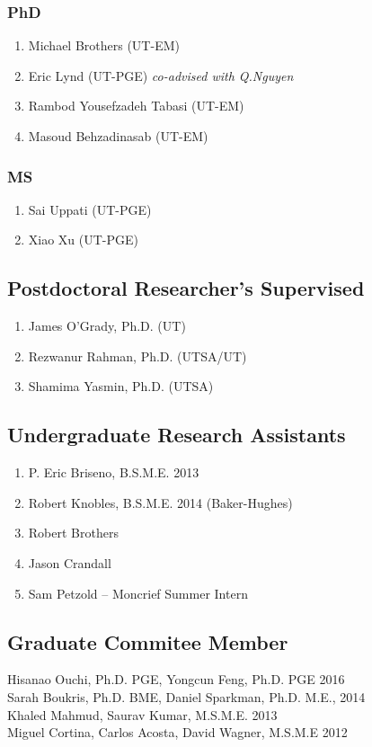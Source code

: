 \subsubsection*{PhD}
\begin{enumerate}
    \item Michael Brothers (UT-EM)
    \item Eric Lynd (UT-PGE) \emph{co-advised with Q.Nguyen}
    \item Rambod Yousefzadeh Tabasi (UT-EM)
    \item Masoud Behzadinasab (UT-EM)
\end{enumerate}

\subsubsection*{MS}
\begin{enumerate}
    \item Sai Uppati (UT-PGE)
    \item Xiao Xu (UT-PGE)
\end{enumerate}

\subsection*{Postdoctoral Researcher's Supervised}
  \begin{enumerate}
      \item James O'Grady, Ph.D. (UT)
      \item Rezwanur Rahman, Ph.D. (UTSA/UT)
      \item Shamima Yasmin, Ph.D. (UTSA)
  \end{enumerate}

\subsection*{Undergraduate Research Assistants}
  \begin{enumerate}
    \item P. Eric Briseno, B.S.M.E. 2013
    \item Robert Knobles, B.S.M.E. 2014 (Baker-Hughes)
    \item Robert Brothers
    \item Jason Crandall
    \item Sam Petzold -- Moncrief Summer Intern
  \end{enumerate}

\subsection*{Graduate Commitee Member}
Hisanao Ouchi, Ph.D. PGE, Yongcun Feng, Ph.D. PGE 2016 \\
Sarah Boukris, Ph.D. BME, Daniel Sparkman, Ph.D. M.E., 2014 \\
Khaled Mahmud, Saurav Kumar, M.S.M.E. 2013 \\
Miguel Cortina, Carlos Acosta, David Wagner, M.S.M.E 2012 

